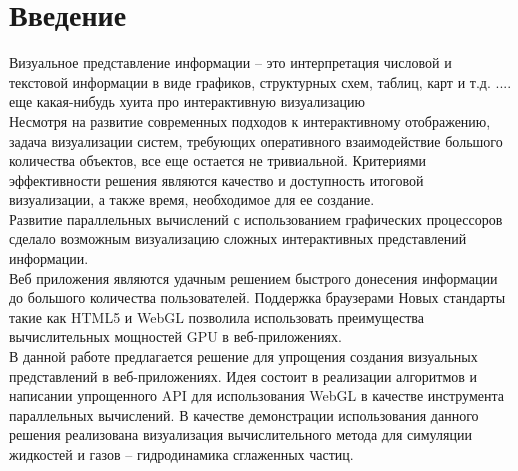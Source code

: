 \newpage
\section*{Введение}



Визуальное представление информации -- это интерпретация числовой и текстовой
информации в виде графиков, структурных схем, таблиц, карт и т.д.
.... еще какая-нибудь хуита про интерактивную визуализацию
\linebreak \\
Несмотря на развитие современных подходов к интерактивному отображению, задача
визуализации систем, требующих оперативного взаимодействие большого количества
объектов, все еще остается не тривиальной. Критериями эффективности решения
являются качество и доступность итоговой визуализации, а также время, необходимое
для ее создание.
\linebreak \\
Развитие параллельных вычислений с использованием графических процессоров сделало 
возможным визуализацию сложных интерактивных представлений информации. 
\linebreak \\
Веб приложения являются удачным решением быстрого донесения информации до большого
количества пользователей. Поддержка браузерами Новых стандарты такие как HTML5 и WebGL 
позволила использовать преимущества вычислительных мощностей GPU в веб-приложениях.
\linebreak \\
В данной работе предлагается решение для упрощения создания визуальных представлений
в веб-приложениях. Идея состоит в реализации алгоритмов и написании упрощенного 
API для использования WebGL в качестве инструмента параллельных вычислений.
В качестве демонстрации использования данного решения реализована визуализация
вычислительного метода для симуляции жидкостей и газов -- гидродинамика сглаженных частиц.

